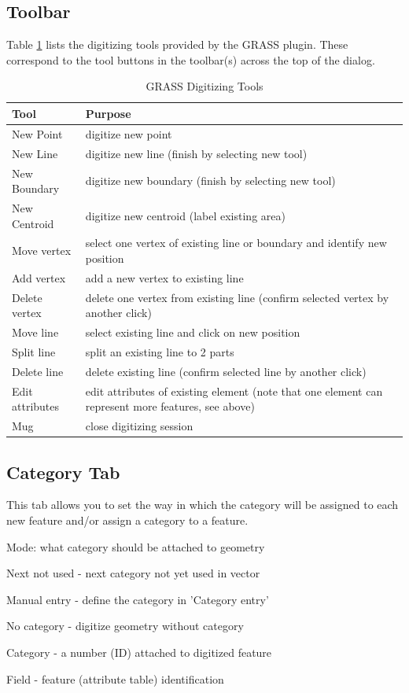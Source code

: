 \subsection{Toolbar}
Table \ref{tab:grass_tools} lists the digitizing tools provided by the GRASS plugin. These correspond to the tool buttons in the toolbar(s) across the top of the dialog.
\begin{table}[h]

\centering
\caption{GRASS Digitizing Tools}\label{tab:grass_tools}\medskip
 \begin{tabular}{|l|p{5in}|}
 \hline \textbf{Tool} & \textbf{Purpose} \\
\hline New Point & digitize new point \\
\hline New Line &  digitize new line (finish by selecting new tool) \\
\hline New Boundary & digitize new boundary (finish by selecting new tool)\\
\hline New Centroid & digitize new centroid (label existing area)\\
\hline Move vertex & select one vertex of existing line or boundary and identify new position\\
\hline Add vertex & add a new vertex to existing line\\
\hline Delete vertex & delete one vertex from existing line (confirm selected vertex by another click)\\
\hline Move line & select existing line and click on new position\\
\hline Split line & split an existing line to 2 parts\\
\hline Delete line & delete existing line (confirm selected line by another click)\\
\hline Edit attributes & edit attributes of existing element (note that one element can represent more features, see above)\\
\hline Mug & close digitizing session\\
\hline
\end{tabular}
\end{table}
\subsection{Category Tab}
This tab allows you to set the way in which the category will be assigned to each new feature and/or assign a category to a feature.
\begin{compactitem}
\item Mode: what category should be attached to geometry
\begin{compactitem}
\item Next not used - next category not yet used in vector
\item Manual entry - define the category in 'Category entry'
\item No category - digitize geometry without category
\end{compactitem}
\item Category - a number (ID) attached to digitized feature
\item Field - feature (attribute table) identification
\end{compactitem}
